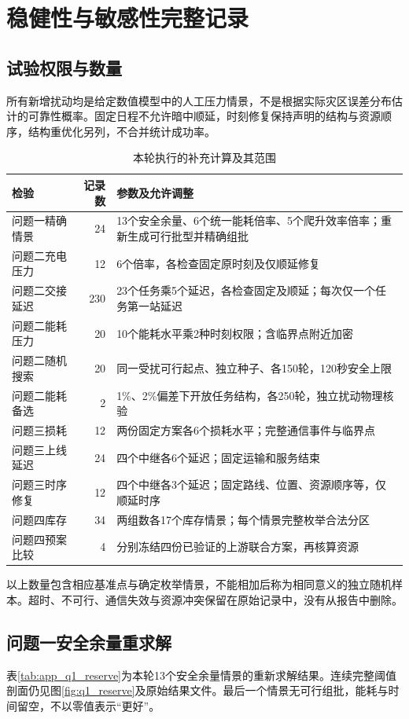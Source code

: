 \section{稳健性与敏感性完整记录}
\label{app:experiments}
\subsection{试验权限与数量}
所有新增扰动均是给定数值模型中的人工压力情景，不是根据实际灾区误差分布估计的可靠性概率。固定日程不允许暗中顺延，时刻修复保持声明的结构与资源顺序，结构重优化另列，不合并统计成功率。
\begin{table}[htbp]\centering\small
\caption{本轮执行的补充计算及其范围}\label{tab:app_experiment_scope}
\begin{tabular}{@{}p{2.3cm}rp{8.9cm}@{}}\toprule
检验 & 记录数 & 参数及允许调整\\\midrule
问题一精确情景 & 24 & 13个安全余量、6个统一能耗倍率、5个爬升效率倍率；重新生成可行批型并精确组批\\
问题二充电压力 & 12 & 6个倍率，各检查固定原时刻及仅顺延修复\\
问题二交接延迟 & 230 & 23个任务乘5个延迟，各检查固定及顺延；每次仅一个任务第一站延迟\\
问题二能耗压力 & 20 & 10个能耗水平乘2种时刻权限；含临界点附近加密\\
问题二随机搜索 & 20 & 同一受扰可行起点、独立种子、各150轮，120秒安全上限\\
问题二能耗备选 & 2 & 1\%、2\%偏差下开放任务结构，各250轮，独立扰动物理核验\\
问题三损耗 & 12 & 两份固定方案各6个损耗水平；完整通信事件与临界点\\
问题三上线延迟 & 24 & 四个中继各6个延迟；固定运输和服务结束\\
问题三时序修复 & 12 & 四个中继各3个延迟；固定路线、位置、资源顺序等，仅顺延时序\\
问题四库存 & 34 & 两组数各17个库存情景；每个情景完整枚举合法分区\\
问题四预案比较 & 4 & 分别冻结四份已验证的上游联合方案，再核算资源\\\bottomrule
\end{tabular}
\end{table}
以上数量包含相应基准点与确定枚举情景，不能相加后称为相同意义的独立随机样本。超时、不可行、通信失效与资源冲突保留在原始记录中，没有从报告中删除。

\subsection{问题一安全余量重求解}
表\ref{tab:app_q1_reserve}为本轮13个安全余量情景的重新求解结果。连续完整阈值剖面仍见图\ref{fig:q1_reserve}及原始结果文件。最后一个情景无可行组批，能耗与时间留空，不以零值表示“更好”。


